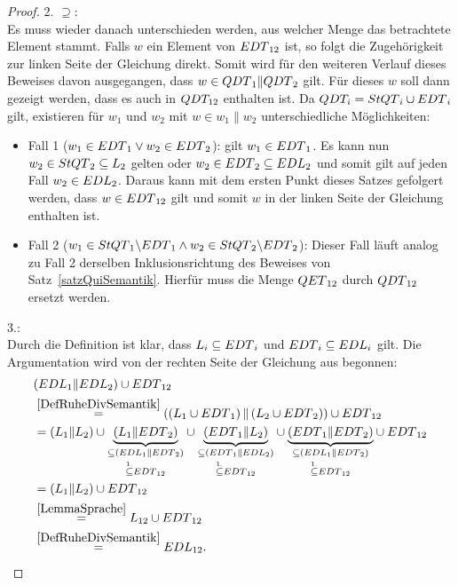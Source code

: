 \begin{proof}
  2. \glqq{}$\supseteq$\grqq{}:\\
  Es muss wieder danach unterschieden werden, aus welcher Menge das betrachtete
  Element stammt. Falls $w$ ein Element von $EDT{}_{12}$ ist, so folgt die
  Zugehörigkeit zur linken Seite der Gleichung direkt. Somit wird für den
  weiteren Verlauf dieses Beweises davon ausgegangen, dass $w\in
  QDT{}_1\|QDT{}_2$ gilt. Für dieses $w$ soll dann gezeigt werden, dass es
  auch in $QDT_{12}$ enthalten ist. Da $QDT_i=StQT{}_i\cup EDT{}_i$ gilt,
  existieren für $w_1$ und $w_2$ mit $w\in w_1\|w_2$ unterschiedliche
  Möglichkeiten:
  \begin{itemize}
    \item Fall 1 ($w_1\in EDT{}_1 \vee w_2\in EDT{}_2$): \OBdA{} gilt $w_1\in
      EDT{}_1$. Es kann nun $w_2\in StQT{}_2 \subseteq L_2$ gelten oder
      $w_2\in EDT{}_2\subseteq EDL{}_2$ und somit gilt auf jeden Fall $w_2\in
      EDL{}_2$. Daraus kann mit dem ersten Punkt dieses Satzes gefolgert
      werden, dass $w\in EDT{}_{12}$ gilt und somit $w$ in der linken Seite
      der Gleichung enthalten ist.
    \item Fall 2 ($w_1\in StQT{}_1\backslash EDT{}_1 \wedge w_2\in StQT{}_2
      \backslash EDT{}_2$): Dieser Fall läuft analog zu Fall 2 derselben
      Inklusionsrichtung des Beweises von Satz~\ref{satzQuiSemantik}. Hierfür
      muss die Menge $QET{}_{12}$ durch $QDT{}_{12}$ ersetzt werden.
  \end{itemize}

  3.:\\
  Durch die Definition ist klar, dass $L_i\subseteq EDT{}_i$ und
  $EDT{}_i\subseteq EDL{}_i$ gilt. Die
  Argumentation wird von der rechten Seite der Gleichung aus begonnen:
  \begin{align*}
    &(EDL{}_1\| EDL{}_2)\cup EDT{}_{12}\\
    &\overset{\ref{DefRuheDivSemantik}}{=}\left(\left(L_1\cup
  EDT{}_1\right)\|\left(L_2\cup EDT{}_2\right)\right)\cup EDT{}_{12}\\
    &=(L_1\|L_2) \cup \underset{\overset{1.}{\subseteq} EDT{}_{12}}{\underset{\subseteq
    (EDL{}_1\|EDT{}_2)}{\underbrace{(L_1\|EDT{}_2)}}} \cup
    \underset{\overset{1.}{\subseteq} EDT{}_{12}}{\underset{\subseteq
    (EDT{}_1\|EDL{}_2)}{\underbrace{(EDT{}_1\|L_2)}}} \cup
    \underset{\overset{1.}{\subseteq}
    EDT{}_{12}}{\underset{\subseteq
    (EDL{}_1\|EDT{}_2)}{\underbrace{(EDT{}_1\|EDT{}_2)}}} \cup EDT{}_{12}\\
    &=(L_1\|L_2) \cup EDT{}_{12}\\
    &\overset{\ref{LemmaSprache}}{=}L_{12}\cup EDT{}_{12}\\
    &\overset{\ref{DefRuheDivSemantik}}{=}EDL{}_{12}.
  \end{align*}
\end{proof}

